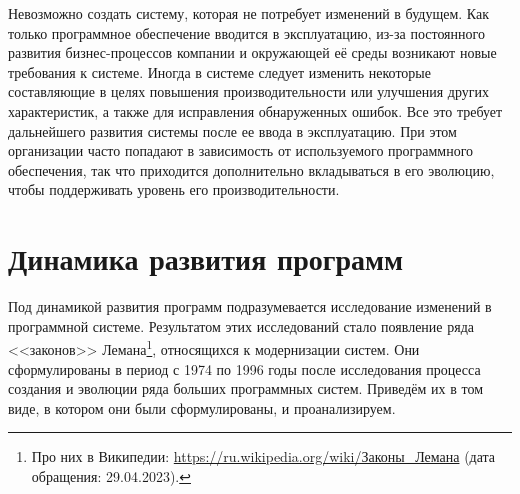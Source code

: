 \documentclass{../../text-style}
\begin{document}
\maketitle
\thispagestyle{empty}


Невозможно создать систему, которая не потребует изменений в будущем. Как только программное обеспечение вводится в эксплуатацию, из-за постоянного развития бизнес-процессов компании и окружающей её среды возникают новые требования к системе. Иногда в системе следует изменить некоторые составляющие в целях повышения производительности или улучшения других характеристик, а также для исправления обнаруженных ошибок. Все это требует дальнейшего развития системы после ее ввода в эксплуатацию. При этом организации часто попадают в зависимость от используемого программного обеспечения, так что приходится дополнительно вкладываться в его эволюцию, чтобы поддерживать уровень его производительности.

\section{Динамика развития программ}

Под динамикой развития программ подразумевается исследование изменений в программной системе. Результатом этих исследований стало появление ряда <<законов>> Лемана\footnote{Про них в Википедии: \url{https://ru.wikipedia.org/wiki/Законы_Лемана} (дата обращения: 29.04.2023).}, относящихся к модернизации систем. Они сформулированы в период с 1974 по 1996 годы после исследования процесса создания и эволюции ряда больших программных систем. Приведём их в том виде, в котором они были сформулированы, и проанализируем.
\end{document}
